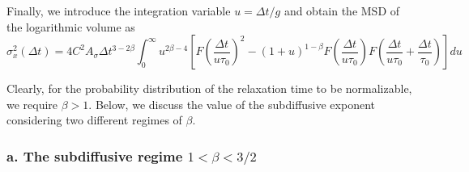 \documentclass[aps, prl, longbibliography, linenumbers, superscriptaddress]{revtex4-2}
\begin{document}
{Finally, we introduce the integration variable $u = \Delta t / g$ and obtain the MSD of the logarithmic volume as
\begin{equation}
	\sigma_x^2(\Delta t) =4C^2A_{\sigma} \Delta t^{3-2\beta} \int_0^\infty u^{2\beta-4} \left[ F\left(\frac{\Delta t}{u\tau_0}\right)^2 - (1+u)^{1-\beta} F\left(\frac{\Delta t}{u\tau_0}\right) F\left(\frac{\Delta t}{u\tau_0} + \frac{\Delta t}{\tau_0}\right) \right] du 
	\label{msd}
\end{equation}

Clearly, for the probability distribution of the relaxation time to be normalizable, we require $\beta>1$. Below, we discuss the value of the subdiffusive exponent considering two different regimes of $\beta$.




\subsubsection{a. The subdiffusive regime $1 < \beta < 3/2$}

}
\end{document}
